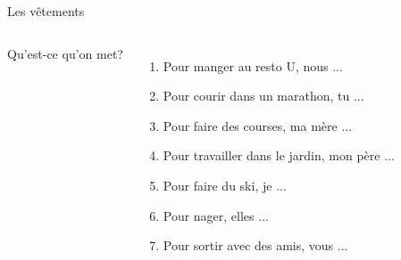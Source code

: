 \begin{frame}{Les vêtements}
  \begin{columns}
      Qu'est-ce qu'on met? \\
      {\small
      \begin{enumerate}
        \item Pour manger au resto U, nous \underline{} ...
        \item Pour courir dans un marathon, tu \underline{} ...
        \item Pour faire des courses, ma mère \underline{} ...
        \item Pour travailler dans le jardin, mon père \underline{} ...
        \item Pour faire du ski, je \underline{} ...
        \item Pour nager, elles \underline{} ...
        \item Pour sortir avec des amis, vous \underline{} ...
      \end{enumerate}
      }
      \begin{minipage}[c][0.6\textheight]{\linewidth}
        \begin{center}
        \end{center}
      \end{minipage}
  \end{columns}
\end{frame}